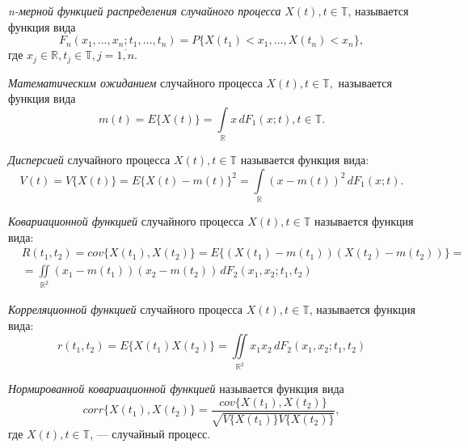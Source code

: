 \begin{Definition}
\label{def:distr_func}
	\textit{n-мерной функцией распределения случайного процесса} $ X(t), t \in \mathbb{T} $, называется функция вида
	\begin{equation*}
		F_n(x_1, \dots, x_n; t_1, \dots, t_n) = P \{ X(t_1) < x_1, \dots, X(t_n) < x_n \},
	\end{equation*}
	где $ x_j \in \mathbb{R}, t_j \in \mathbb{T}, j = \overline{1,n} $.
\end{Definition}

\begin{Definition}
	\textit{Математическим ожиданием} случайного процесса $ X(t), t \in \mathbb{T}, $ называется функция вида
	\begin{equation*}
		m(t) = E \{ X(t) \} = \int \limits_{\mathbb{R}} x \, dF_1(x;t), t \in \mathbb{T}.
	\end{equation*}
\end{Definition}

\begin{Definition}
	\textit{Дисперсией} случайного процесса $ X(t), t \in \mathbb{T} $ называется функция вида:
	\begin{equation*}
		V(t) = {V \{ X(t) \} = E \{ X(t) - m(t) \}}^2 = \int \limits_{\mathbb{R}} {(x - m(t))}^2 \, dF_1(x; t).
	\end{equation*}
\end{Definition}

\begin{Definition}
	\textit{Ковариационной функцией} случайного процесса $ X(t), t \in \mathbb{T} $ называется функция вида:
	\begin{eqnarray*}
		& R(t_1, t_2) = cov\{ X(t_1), X(t_2) \} = E \{ (X(t_1) - m(t_1)) (X(t_2) - m(t_2)) \} = \\
		& = \iint \limits_{\mathbb{R}^2} (x_1 - m(t_1)) (x_2 - m(t_2)) \, dF_2(x_1, x_2; t_1, t_2)
	\end{eqnarray*}
\end{Definition}

\begin{Definition}
	\textit{Корреляционной функцией} случайного процесса $ X(t), t \in \mathbb{T} $, называется функция вида:
	\begin{equation*}
		r(t_1, t_2) = E \{ X(t_1)X(t_2) \} = \iint \limits_{\mathbb{R}^2} x_1 x_2 \, dF_2(x_1, x_2; t_1, t_2)
	\end{equation*}
\end{Definition}

\begin{Definition}
\label{def:corr_cov}
	\textit{Нормированной ковариационной функцией} называется функция вида
	\begin{equation*}
		corr\{ X(t_1), X(t_2)\} = \frac{cov\{ X(t_1), X(t_2) \}}{\sqrt{ V\{ X(t_1) \} V\{ X(t_2) \} }},
	\end{equation*}
	где $ X(t), t \in \mathbb{T} $, --- случайный процесс.
\end{Definition}

